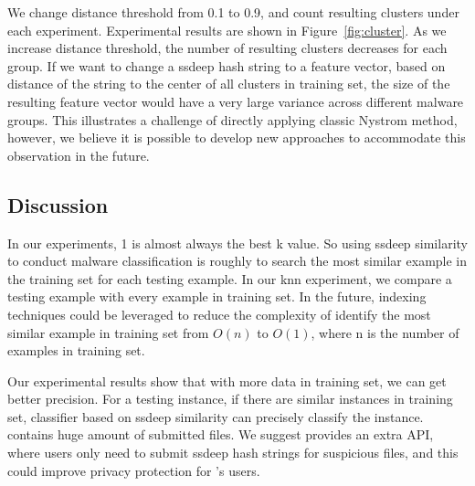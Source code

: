 We change distance threshold from 0.1 to 0.9, 
and count resulting clusters under each experiment. 
Experimental results are shown in Figure~\ref{fig:cluster}. 
As we increase distance threshold, the number of resulting clusters decreases for each group. 
If we want to change a ssdeep hash string to a feature vector, 
based on distance of the string to the center of all clusters in training set, 
the size of the resulting feature vector would have a very large variance across different malware groups. 
This illustrates a challenge of directly applying
classic Nystrom method, however, we believe
it is possible to develop new approaches to
accommodate this observation in the future.




\subsection{Discussion}

In our experiments, 1 is almost always the best k value. 
So using ssdeep similarity to conduct malware classification 
is roughly to search the most similar example in the training set for each testing example.
In our knn experiment, we compare a testing example with every example in training set. 
In the future, indexing techniques could be leveraged to reduce the complexity of identify 
the most similar example in training set from $O(n)$ to $O(1)$, where n is the number of examples in training set. 

Our experimental results show that with more data in training set, 
we can get better precision. 
For a testing instance, if there are similar instances in training set, 
classifier based on ssdeep similarity can precisely classify the instance. 
\vt{} contains huge amount of submitted files. We suggest \vt{} provides an extra API, 
where users only need to submit ssdeep hash strings for suspicious files, 
and this could improve privacy protection for \vt{}’s users.  



